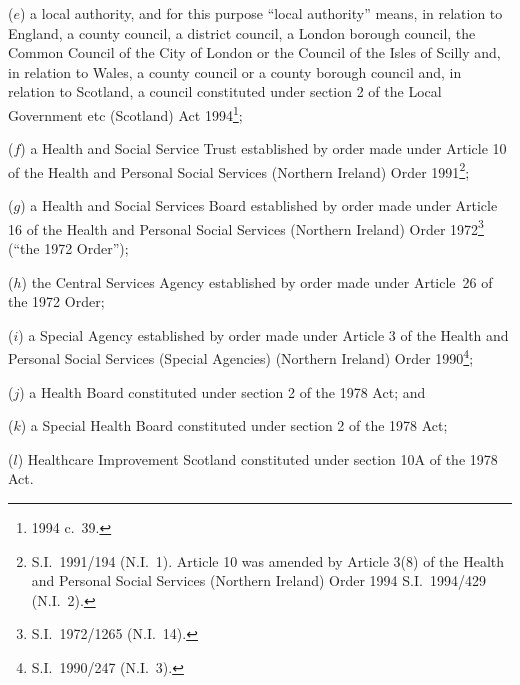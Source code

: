 \documentclass[12pt,a4paper]{article}
\begin{document}
\begin{enumerate}

($e$) a local authority, and for this purpose “local authority” means, in relation to England, a county council, a district council, a London borough council, the Common Council of the City of London or the Council of the Isles of Scilly and, in relation to Wales, a county council or a county borough council and, in relation to Scotland, a council constituted under section 2 of the Local Government etc (Scotland) Act 1994\footnote{1994 c.\ 39.};

($f$) a Health and Social Service Trust established by order made under Article 10 of the Health and Personal Social Services (Northern Ireland) Order 1991\footnote{S.I.\ 1991/194 (N.I.~1). Article 10 was amended by Article 3(8) of the Health and Personal Social Services (Northern Ireland) Order 1994 S.I.\ 1994/429 (N.I.~2).};

($g$) a Health and Social Services Board established by order made under Article 16 of the Health and Personal Social Services (Northern Ireland) Order 1972\footnote{S.I.\ 1972/1265 (N.I.~14).} (“the 1972 Order”);

($h$) the Central Services Agency established by order made under Article~26 of the 1972 Order;

($i$) a Special Agency established by order made under Article 3 of the Health and Personal Social Services (Special Agencies) (Northern Ireland) Order 1990\footnote{S.I.\ 1990/247 (N.I.~3).};

($j$) a Health Board constituted under section 2 of the 1978 Act; and

($k$) a Special Health Board constituted under section 2 of the 1978 Act;

($l$) Healthcare Improvement Scotland constituted under section 10A of the 1978 Act.
\end{enumerate}

\end{document}
